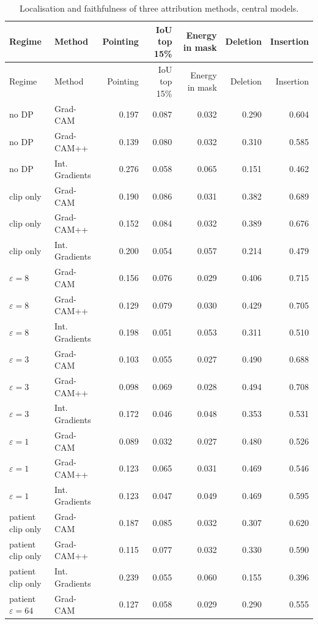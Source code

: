 {\footnotesize
\begin{longtable}{llrrrrr}
\caption{Localisation and faithfulness of three attribution methods, central models.}\label{tab:s_xai}\\
\toprule
Regime & Method & Pointing & IoU top 15\% & Energy in mask & Deletion & Insertion \\
\midrule
\endfirsthead
\toprule
Regime & Method & Pointing & IoU top 15\% & Energy in mask & Deletion & Insertion \\
\midrule
\endhead
\bottomrule
\endlastfoot
no DP & Grad-CAM & 0.197 & 0.087 & 0.032 & 0.290 & 0.604 \\
no DP & Grad-CAM++ & 0.139 & 0.080 & 0.032 & 0.310 & 0.585 \\
no DP & Int. Gradients & 0.276 & 0.058 & 0.065 & 0.151 & 0.462 \\
clip only & Grad-CAM & 0.190 & 0.086 & 0.031 & 0.382 & 0.689 \\
clip only & Grad-CAM++ & 0.152 & 0.084 & 0.032 & 0.389 & 0.676 \\
clip only & Int. Gradients & 0.200 & 0.054 & 0.057 & 0.214 & 0.479 \\
$\varepsilon=8$ & Grad-CAM & 0.156 & 0.076 & 0.029 & 0.406 & 0.715 \\
$\varepsilon=8$ & Grad-CAM++ & 0.129 & 0.079 & 0.030 & 0.429 & 0.705 \\
$\varepsilon=8$ & Int. Gradients & 0.198 & 0.051 & 0.053 & 0.311 & 0.510 \\
$\varepsilon=3$ & Grad-CAM & 0.103 & 0.055 & 0.027 & 0.490 & 0.688 \\
$\varepsilon=3$ & Grad-CAM++ & 0.098 & 0.069 & 0.028 & 0.494 & 0.708 \\
$\varepsilon=3$ & Int. Gradients & 0.172 & 0.046 & 0.048 & 0.353 & 0.531 \\
$\varepsilon=1$ & Grad-CAM & 0.089 & 0.032 & 0.027 & 0.480 & 0.526 \\
$\varepsilon=1$ & Grad-CAM++ & 0.123 & 0.065 & 0.031 & 0.469 & 0.546 \\
$\varepsilon=1$ & Int. Gradients & 0.123 & 0.047 & 0.049 & 0.469 & 0.595 \\
patient clip only & Grad-CAM & 0.187 & 0.085 & 0.032 & 0.307 & 0.620 \\
patient clip only & Grad-CAM++ & 0.115 & 0.077 & 0.032 & 0.330 & 0.590 \\
patient clip only & Int. Gradients & 0.239 & 0.055 & 0.060 & 0.155 & 0.396 \\
patient $\varepsilon=64$ & Grad-CAM & 0.127 & 0.058 & 0.029 & 0.290 & 0.555 \\

\end{longtable}}
